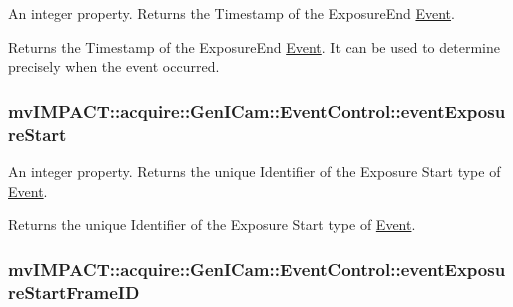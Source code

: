 An integer property. Returns the Timestamp of the Exposure\+End \hyperlink{classmv_i_m_p_a_c_t_1_1acquire_1_1_event}{Event}. 

Returns the Timestamp of the Exposure\+End \hyperlink{classmv_i_m_p_a_c_t_1_1acquire_1_1_event}{Event}. It can be used to determine precisely when the event occurred. \hypertarget{classmv_i_m_p_a_c_t_1_1acquire_1_1_gen_i_cam_1_1_event_control_a1c6acc9ed208c1c50519e2e3cbbc6656}{
\subsubsection[{event\+Exposure\+Start}]{ mv\+I\+M\+P\+A\+C\+T\+::acquire\+::\+Gen\+I\+Cam\+::\+Event\+Control\+::event\+Exposure\+Start}}\label{classmv_i_m_p_a_c_t_1_1acquire_1_1_gen_i_cam_1_1_event_control_a1c6acc9ed208c1c50519e2e3cbbc6656}


An integer property. Returns the unique Identifier of the Exposure Start type of \hyperlink{classmv_i_m_p_a_c_t_1_1acquire_1_1_event}{Event}. 

Returns the unique Identifier of the Exposure Start type of \hyperlink{classmv_i_m_p_a_c_t_1_1acquire_1_1_event}{Event}. \hypertarget{classmv_i_m_p_a_c_t_1_1acquire_1_1_gen_i_cam_1_1_event_control_a72c8d3a3d49603ed0a23b9b3d8a100b1}{
\subsubsection[{event\+Exposure\+Start\+Frame\+I\+D}]{ mv\+I\+M\+P\+A\+C\+T\+::acquire\+::\+Gen\+I\+Cam\+::\+Event\+Control\+::event\+Exposure\+Start\+Frame\+I\+D}}\label{classmv_i_m_p_a_c_t_1_1acquire_1_1_gen_i_cam_1_1_event_control_a72c8d3a3d49603ed0a23b9b3d8a100b1}


